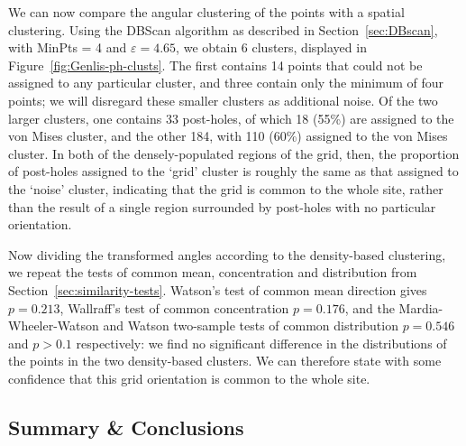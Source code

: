 \documentclass[../../ArchStats.tex]{subfiles}
\begin{document}
We can now compare the angular clustering of the points with a spatial clustering. Using the DBScan algorithm as described in Section~\ref{sec:DBscan}, with MinPts = 4 and $\varepsilon = 4.65$, we obtain 6 clusters, displayed in Figure~\ref{fig:Genlis-ph-clusts}. The first contains 14 points that could not be assigned to any particular cluster, and three contain only the minimum of four points; we will disregard these smaller clusters as additional noise. Of the two larger clusters, one contains 33 post-holes, of which 18 (55\%) are assigned to the von Mises cluster, and the other 184, with 110 (60\%) assigned to the von Mises cluster. In both of the densely-populated regions of the grid, then, the proportion of post-holes assigned to the `grid' cluster is roughly the same as that assigned to the `noise' cluster, indicating that the grid is common to the whole site, rather than the result of a single region surrounded by post-holes with no particular orientation.

Now dividing the transformed angles according to the density-based clustering, we repeat the tests of common mean, concentration and distribution from Section~\ref{sec:similarity-tests}. Watson's test of common mean direction gives $p= 0.213$, Wallraff's test of common concentration $p=0.176$, and the Mardia-Wheeler-Watson and Watson two-sample tests of common distribution $p = 0.546$ and $p > 0.1$ respectively: we find no significant difference in the distributions of the points in the two density-based clusters. We can therefore state with some confidence that this grid orientation is common to the whole site.






\subsection{Summary \& Conclusions}

\end{document}
